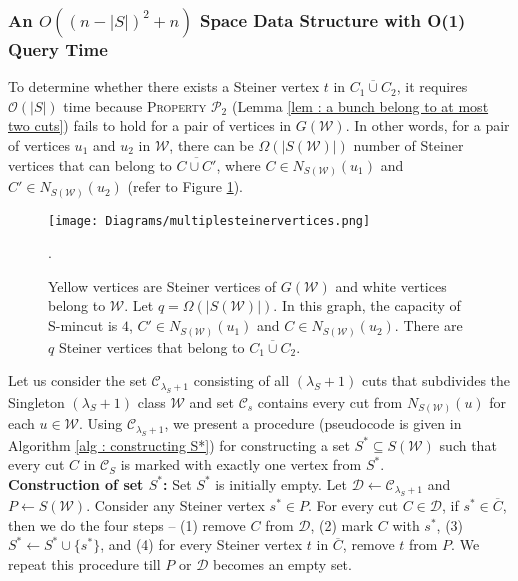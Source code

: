 \documentclass[letterpaper,11pt]{article}
\begin{document}
\subsubsection*{An $O((n-|S|)^{2}+n)$ Space Data Structure with O(1) Query Time}
To determine whether there exists a Steiner vertex $t$ in $\overline{C_1\cup C_2}$, it requires ${\mathcal O}(|S|)$ time because \textsc{Property ${\mathcal P}_2$} (Lemma \ref{lem : a bunch belong to at most two cuts}) fails to hold for a pair of vertices in $G({\mathcal W})$. In other words, for a pair of vertices $u_1$ and $u_2$ in ${\mathcal W}$, there can be $\Omega(|S({\mathcal W})|)$ number of Steiner vertices that can belong to $\overline{C\cup C'}$, where $C\in N_{S({\mathcal W})}(u_1)$ and $C'\in N_{S({\mathcal W})}(u_2)$ (refer to Figure \ref{fig : 2nd figure in overview}). 


  \begin{figure}
 \centering
    \texttt{[image: Diagrams/multiplesteinervertices.png]} 
   \caption{Yellow vertices are Steiner vertices of $G({\mathcal W})$ and white vertices belong to ${\mathcal W}$. Let $q={\Omega}(|S({\mathcal W})|)$. In this graph, the capacity of S-mincut is $4$, $C'\in N_{S({\mathcal W})}(u_1)$ and $C\in N_{S({\mathcal W})}(u_2)$. There are $q$ Steiner vertices that belong to $\overline{C_1\cup C_2}$. }
  \label{fig : 2nd figure in overview}. 
\end{figure}

Let us consider the set ${\mathcal C}_{\lambda_S+1}$ consisting of all $(\lambda_S+1)$ cuts that subdivides the Singleton $(\lambda_S+1)$ class ${\mathcal W}$ and set ${\mathcal C}_s$ contains every cut from $N_{S({\mathcal W})}(u)$ for each $u\in {\mathcal W}$. Using ${\mathcal C}_{\lambda_S+1}$, we present a procedure (pseudocode is given in Algorithm \ref{alg : constructing S*}) for constructing a set $S^*\subseteq S({\mathcal W})$ such that every cut $C$ in ${\mathcal C}_S$ is marked with exactly one vertex from $S^*$. \\

\noindent
\textbf{Construction of set $S^*$:} Set $S^*$ is initially empty. Let ${\mathcal D}\gets {\mathcal C}_{\lambda_S+1}$ and $P\gets S({\mathcal W})$. Consider any Steiner vertex $s^*\in P$. For every cut $C\in {\mathcal D}$, if $s^*\in \overline{C}$, then we do the four steps -- (1) remove $C$ from ${\mathcal D}$, (2) mark $C$ with $s^*$, (3) $S^*\gets S^*\cup \{s^*\}$, and (4) for every Steiner vertex $t$ in $\overline{C}$, remove $t$ from $P$. We repeat this procedure till $P$ or ${\mathcal D}$ becomes an empty set.\\
\end{document}
